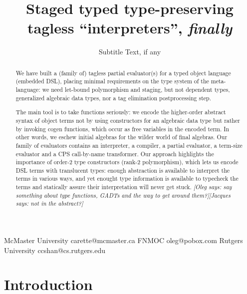 \documentclass[preprint]{sigplanconf}
\newcommand{\jacques}[1]{{\it [Jacques says: #1]}}
\newcommand{\oleg}[1]{{\it [Oleg says: #1]}}
\begin{document}
\copyrightdata{[to be supplied]} 


\title{Staged typed type-preserving tagless ``interpreters'', \emph{finally}}
\subtitle{Subtitle Text, if any}

           {McMaster University}
           {carette@mcmaster.ca}
           {FNMOC}
           {oleg@pobox.com}
           {Rutgers University}
           {ccshan@cs.rutgers.edu}

\maketitle

\begin{abstract}
We have built a (family of) tagless partial evaluator(s) for a typed object
language (embedded DSL), placing minimal requirements on
the type system of the meta-language:
we need let-bound polymorphism and staging, but not dependent
types, generalized algebraic data types, nor a tag elimination 
postprocessing step.

The main tool is to take functions seriously: we encode the
higher-order abstract syntax of object terms not by using constructors for
an algebraic data type but rather by invoking cogen functions, which occur as
free variables in the encoded term.  In other words, we eschew initial
algebras for the wilder world of final algebras.
Our family of evaluators contains an interpreter, a compiler, a partial
evaluator, a term-size evaluator and a CPS call-by-name transformer.
Our approach highlights the importance of order-2 type constructors
(rank-2 polymorphism), which lets us encode DSL terms with
translucent types: enough abstraction is available to interpret the
terms in various ways, and yet enought type information is available 
to typecheck the terms and statically assure their interpretation will
never get stuck.
\oleg{say something about type functions, GADTs and the way to get
  around them?}\jacques{not in the abstract?}
\end{abstract}


\section{Introduction}\label{intro}
\end{document}
